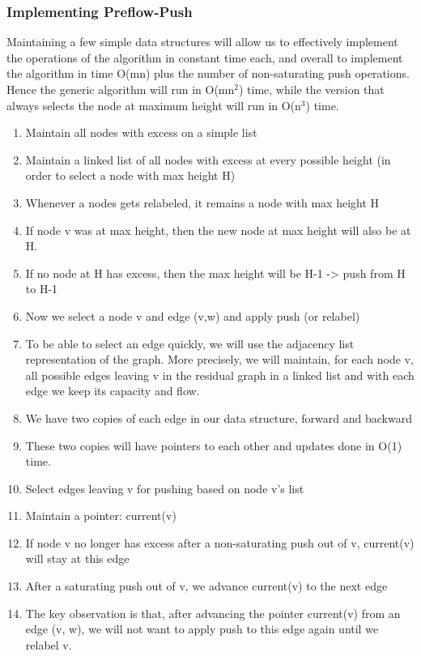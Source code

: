 \documentclass{article}
\begin{document}
\subsubsection{Implementing Preflow-Push}
Maintaining a few simple data structures will allow us to effectively implement the operations of the algorithm in constant time each, and overall to implement the algorithm in time O(mn) plus the number of non-saturating push operations. Hence the generic algorithm will run in O(mn$^2$) time, while the version that always selects the node at maximum height will run in O(n$^3$) time.\\

\begin{enumerate}
    \item Maintain all nodes with excess on a simple list
    \item Maintain a linked list of all nodes with excess at every possible height (in order to select a node with max height H)
    \item Whenever a nodes gets relabeled, it remains a node with max height H
    \item If node v was at max height, then the new node at max height will also be at H.
    \item If no node at H has excess, then the max height will be H-1 -> push from H to H-1
    \item Now we select a node v and edge (v,w) and apply push (or relabel)
    \item To be able to select an edge quickly, we will use the adjacency list representation of the graph. More precisely, we will maintain, for each node v, all possible edges leaving v in the residual graph in a linked list and with each edge we keep its capacity and flow.
    \item We have two copies of each edge in our data structure, forward and backward
    \item These two copies will have pointers to each other and updates done in O(1) time.
    \item Select edges leaving v for pushing based on node v's list
    \item Maintain a pointer: current(v)
    \item If node v no longer has excess after a non-saturating push out of v, current(v) will stay at this edge
    \item After a saturating push out of v, we advance current(v) to the next edge
    \item The key observation is that, after advancing the pointer current(v) from an edge (v, w), we will not want to apply push to this edge again until we relabel v.
\end{enumerate}
\end{document}
